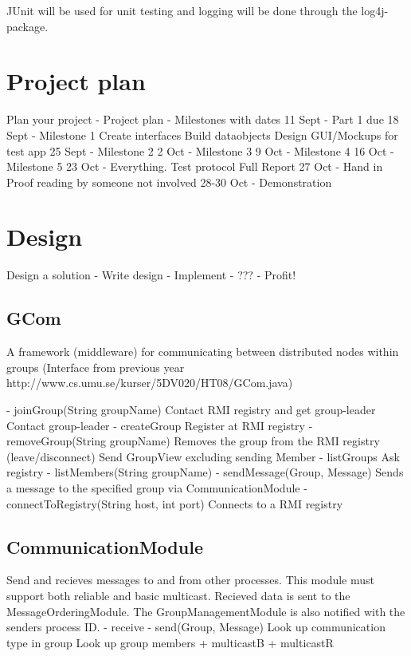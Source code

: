 \documentclass[11pt,swedish]{article}
\begin{document}
JUnit will be used for unit testing and logging will be done through the log4j-package. 

\section{Project plan}
Plan your project
- Project plan
- Milestones with dates
	11 Sept		- Part 1 due
	18 Sept		- Milestone 1
					Create interfaces
					Build dataobjects
					Design GUI/Mockups for test app
	25 Sept		- Milestone 2
	2 Oct		- Milestone 3
	9 Oct		- Milestone 4
	16 Oct		- Milestone 5
	23 Oct		- Everything.
		Test protocol
		Full Report
	27 Oct 		- Hand in
		Proof reading by someone not involved
	28-30 Oct 	- Demonstration

\section{Design}
Design a solution
- Write design
- Implement
- ???
- Profit!


\subsection{GCom}
A framework (middleware) for communicating between distributed nodes within groups
	(Interface from previous year http://www.cs.umu.se/kurser/5DV020/HT08/GCom.java)

- joinGroup(String groupName)
	Contact RMI registry and get group-leader
	Contact group-leader
- createGroup
	Register at RMI registry
- removeGroup(String groupName)
	Removes the group from the RMI registry
(leave/disconnect)
	Send GroupView excluding sending Member
- listGroups
	Ask registry
- listMembers(String groupName)
- sendMessage(Group, Message)
	Sends a message to the specified group via CommunicationModule
- connectToRegistry(String host, int port)
	Connects to a RMI registry


\subsection{CommunicationModule}
Send and recieves messages to and from other processes. This module must support both reliable and basic multicast. Recieved data is sent to the MessageOrderingModule. The GroupManagementModule is also notified with the senders process ID. 
- receive
- send(Group, Message)
	Look up communication type in group
	Look up group members
+ multicastB
+ multicastR
\end{document}
